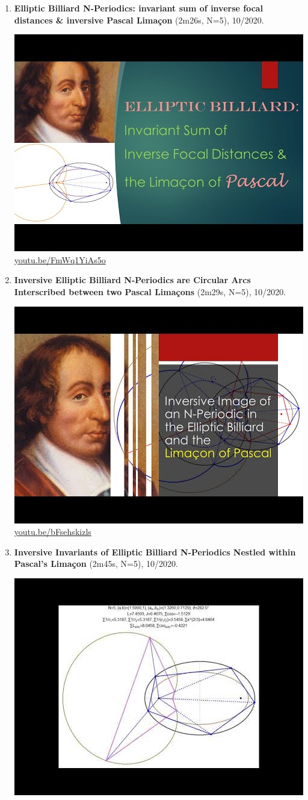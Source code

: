 \documentclass[12pt]{amsart}
\begin{document}
\begin{enumerate}[resume]
\item \textbf{Elliptic Billiard N-Periodics: invariant sum of inverse focal distances \& inversive Pascal Limaçon} (2m26s, N=5), 10/2020. 
\begin{center}\includegraphics[width=.5\textwidth]{pics/FmWq1YiAs5o.jpg} \\ 
\href{https://youtu.be/FmWq1YiAs5o}{\url{youtu.be/FmWq1YiAs5o}}\end{center}
% 
\item \textbf{Inversive Elliptic Billiard N-Periodics are Circular Arcs Interscribed between two Pascal Limaçons} (2m29s, N=5), 10/2020. 
\begin{center}\includegraphics[width=.5\textwidth]{pics/bFsehskizls.jpg} \\ 
\href{https://youtu.be/bFsehskizls}{\url{youtu.be/bFsehskizls}}\end{center}
% 
\item \textbf{Inversive Invariants of Elliptic Billiard N-Periodics Nestled within Pascal's Limaçon} (2m45s, N=5), 10/2020. 
\begin{center}\includegraphics[width=.5\textwidth]{pics/wkstGKq5jOo.jpg} \\ 

\end{center}
\end{enumerate}
\end{document}
